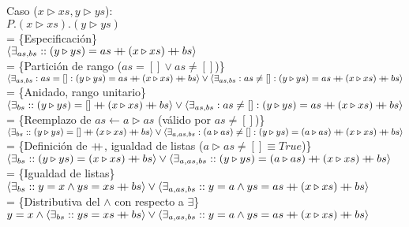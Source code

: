 \documentclass[12pt]{article}
\newcommand{\concat}{%
  \mathbin{{+}\mspace{-8mu}{+}}%
}
\begin{document}
\begin{itemize}
    \bigbreak

    Caso ($x \triangleright xs, y \triangleright ys$):\\
    $ P.(x \triangleright xs).(y \triangleright ys) $\\
    = \{Especificación\}\\
    $ \langle \exists_{as,bs} :: (y \triangleright ys) = as \concat (x \triangleright xs) \concat bs \rangle $\\
    = \{Partición de rango ($as = [] \lor as \neq []$)\}\\
    $ \langle \exists_{as,bs} : as = [] : (y \triangleright ys) = as \concat (x \triangleright xs) \concat bs \rangle \lor \langle \exists_{as,bs} : as \neq [] : (y \triangleright ys) = as \concat (x \triangleright xs) \concat bs \rangle $\\
    = \{Anidado, rango unitario\}\\
    $ \langle \exists_{bs} :: (y \triangleright ys) = [] \concat (x \triangleright xs) \concat bs \rangle \lor \langle \exists_{as,bs} : as \neq [] : (y \triangleright ys) = as \concat (x \triangleright xs) \concat bs \rangle $\\
    = \{Reemplazo de $as \leftarrow a \triangleright as$ (válido por $as \neq []$)\}\\
    $ \langle \exists_{bs} :: (y \triangleright ys) = [] \concat (x \triangleright xs) \concat bs \rangle \lor \langle \exists_{a,as,bs} : (a \triangleright as) \neq [] : (y \triangleright ys) = (a \triangleright as) \concat (x \triangleright xs) \concat bs \rangle $\\
    = \{Definición de $\concat$, igualdad de listas ($a \triangleright as \neq [] \equiv True$)\}\\
    $ \langle \exists_{bs} :: (y \triangleright ys) = (x \triangleright xs) \concat bs \rangle \lor \langle \exists_{a,as,bs} :: (y \triangleright ys) = (a \triangleright as) \concat (x \triangleright xs) \concat bs \rangle $\\
    = \{Igualdad de listas\}\\
    $ \langle \exists_{bs} :: y = x \land ys = xs \concat bs \rangle \lor \langle \exists_{a,as,bs} :: y = a \land ys = as \concat (x \triangleright xs) \concat bs \rangle $\\
    = \{Distributiva del $\land$ con respecto a $\exists$\}\\
    $ y = x \land \langle \exists_{bs} :: ys = xs \concat bs \rangle \lor \langle \exists_{a,as,bs} :: y = a \land ys = as \concat (x \triangleright xs) \concat bs \rangle $\\

\end{itemize}
\end{document}
